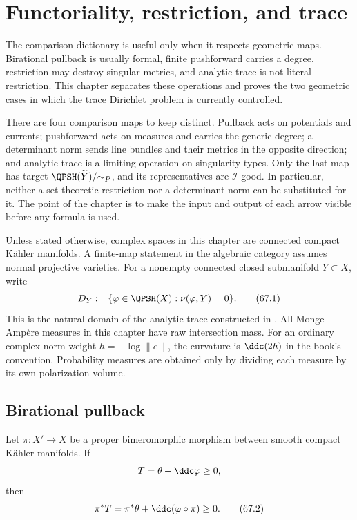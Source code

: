 \chapter{Functoriality, restriction, and trace}
\label{chap:functoriality-trace}

The comparison dictionary is useful only when it respects geometric
maps. Birational pullback is usually formal, finite pushforward carries
a degree, restriction may destroy singular metrics, and analytic trace
is not literal restriction. This chapter separates these operations and
proves the two geometric cases in which the trace Dirichlet problem is
currently controlled.

There are four comparison maps to keep distinct. Pullback acts on
potentials and currents; pushforward acts on measures and carries the
generic degree; a determinant norm sends line bundles and their metrics in
the opposite direction; and analytic trace is a limiting operation on
singularity types. Only the last map has target
$\QPSH(\widetilde Y)/{\sim_P}$, and its representatives are
$\mathcal I$-good. In particular, neither a
set-theoretic restriction nor a determinant norm can be substituted for it.
The point of the chapter is to make the input and output of each arrow
visible before any formula is used.

Unless stated otherwise, complex spaces in this chapter are connected
compact K\"ahler manifolds. A finite-map statement in the algebraic
category assumes normal projective varieties. For a nonempty connected closed submanifold
$Y\subset X$, write
\[
 D_Y:=\{\varphi\in\QPSH(X):\nu(\varphi,Y)=0\}.
\tag{67.1}\label{eq:functor-trace-domain}
\]
This is the natural domain of the analytic trace constructed in
.
All Monge--Amp\`ere measures in this chapter have raw intersection mass.
For an ordinary complex norm weight $h=-\log\|e\|$, the curvature is
$\ddc(2h)$ in the book's convention. Probability measures are obtained
only by dividing each measure by its own polarization volume.

\section{Birational pullback}
\label{sec:functor-birational}

Let $\pi:X'\to X$ be a proper bimeromorphic morphism between smooth
compact K\"ahler manifolds. If
\[
                         T=\theta+\ddc\varphi\geq0,
\]
then
\[
             \pi^*T=\pi^*\theta+\ddc(\varphi\circ\pi)\geq0.
\tag{67.2}\label{eq:functor-current-pullback}
\]

